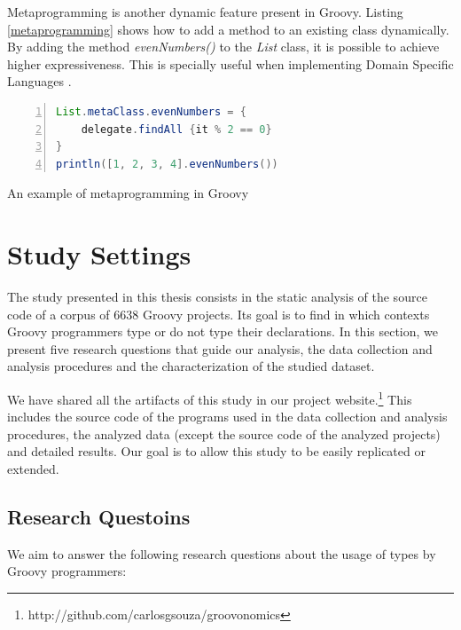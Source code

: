 \documentclass[msc]{ppgccufmg}
\begin{document}
Metaprogramming is another dynamic feature present in Groovy. 
Listing \ref{metaprogramming} shows how to add a method to an existing class dynamically.
By adding the method \emph{evenNumbers()} to the \emph{List} class, it is possible to achieve higher expressiveness.
This is specially useful when implementing Domain Specific Languages \cite{fowler10}.

\begin{Listing}[ht]
\begin{lstlisting}[basicstyle=\ttfamily, language=Java,tabsize=2,breaklines=true,numbers=left]
List.metaClass.evenNumbers = {
	delegate.findAll {it % 2 == 0}
}
println([1, 2, 3, 4].evenNumbers())

\end{lstlisting}
\caption{An example of metaprogramming in Groovy}
\label{metaprogramming}
\end{Listing}%













%
%
\chapter{Study Settings\label{study-settings}}

The study presented in this thesis consists in the static analysis of the source code of a corpus of 6638 Groovy projects.
Its goal is to find in which contexts Groovy programmers type or do not type their declarations.
In this section, we present five research questions that guide our analysis, the data collection and analysis procedures and the characterization of the studied dataset.

We have shared all the artifacts of this study in our project website.\footnote{http://github.com/carlosgsouza/groovonomics}
This includes the source code of the programs used in the data collection and analysis procedures, the analyzed data (except the source code of the analyzed projects) and detailed results.
Our goal is to allow this study to be easily replicated or extended.

\section{Research Questoins\label{questions}}
We aim to answer the following research questions about the usage of types by Groovy programmers:
\end{document}
